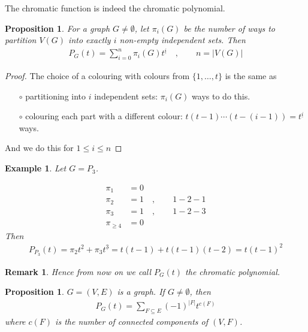 \documentclass[a4paper]{article}
\theoremstyle{plain}
\newtheorem{proposition}[lemma]{Proposition}
\theoremstyle{myremark}
\newtheorem{remark}[lemma]{Remark}
\newtheorem{example}[lemma]{Example}
\begin{document}
The chromatic function is indeed the chromatic polynomial.
\begin{proposition}
For a graph $G\neq \emptyset$, let $\pi_i(G)$ be the number of ways to partition $V(G)$ into exactly $i$ non-empty independent sets. Then
\begin{align*}
P_G(t)=\sum_{i=0}^n \pi_i(G) t^{\underline{i}}\quad ,\qquad n=|V(G)|
\end{align*}
\end{proposition}
\begin{proof}
The choice of a colouring with colours from $\lbrace 1,\dots , t\rbrace$ is the same as 
\begin{enumerate}
\item[$\circ$] partitioning into $i$ independent sets: $\pi_i(G)$ ways to do this.
\item[$\circ$] colouring each part with a different colour: $t(t-1) \cdots  (t-(i-1))=t^{\underline{i}}$ ways.
\end{enumerate}
And we do this for $1\le i \le n$
\end{proof}
\begin{example}
Let $G=P_3$. 
\begin{align*}
\pi_1 &=0\\
\pi_2 &= 1\quad ,\qquad 1-2-1\\
\pi_3 &= 1\quad ,\qquad 1-2-3\\
\pi_{\ge 4} &= 0
\end{align*}
Then
\begin{align*}
P_{P_3}(t)=\pi_2t^{\underline{2}}+\pi_3 t^{\underline{3}}=t(t-1)+t(t-1)(t-2)=t(t-1)^2
\end{align*}
\end{example}
\begin{remark}
Hence from now on we call $P_G(t)$ the chromatic polynomial.
\end{remark}
\begin{proposition}
$G=(V,E)$ is a graph. If $G\neq \emptyset$, then
\begin{align*}
P_G(t)=\sum_{F\subseteq E} (-1)^{|F|} t^{c(F)}
\end{align*}
where $c(F)$ is the number of connected components of $(V,F)$.
\end{proposition}
\end{document}
